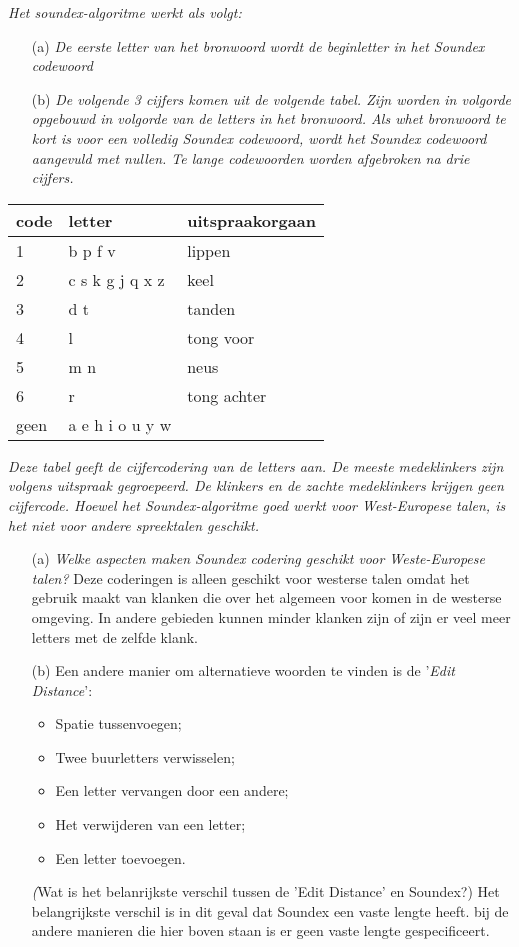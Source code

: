 \emph{Het soundex-algoritme werkt als volgt:}
\begin{itemize}
  \item[(a)]\emph{De eerste letter van het bronwoord wordt de beginletter in het Soundex codewoord}
  \item[(b)]\emph{De volgende 3 cijfers komen uit de volgende tabel. Zijn worden in volgorde opgebouwd in volgorde van de letters in het bronwoord. Als whet bronwoord te kort is voor een volledig Soundex codewoord, wordt het Soundex codewoord aangevuld met nullen. Te lange codewoorden worden afgebroken na drie cijfers.}
\end{itemize}

\begin{tabular}{lll}
code & letter & uitspraakorgaan \\
\hline
1 & b p f v & lippen\\
2 & c s k g j q x z & keel\\
3 & d t & tanden\\
4 & l & tong voor\\
5 & m n & neus \\
6 & r & tong achter \\
geen & a e h i o u y w & \\
\end{tabular}

\emph{Deze tabel geeft de cijfercodering van de letters aan. De meeste medeklinkers zijn volgens uitspraak gegroepeerd. De klinkers en de zachte medeklinkers krijgen geen cijfercode. Hoewel het Soundex-algoritme goed werkt voor West-Europese talen, is het niet voor andere spreektalen geschikt.}
\begin{itemize}
  \item[(a)] \emph{Welke aspecten maken Soundex codering geschikt voor Weste-Europese talen?}
    Deze coderingen is alleen geschikt voor westerse talen omdat het gebruik maakt van klanken die over het algemeen voor komen in de westerse omgeving. In andere gebieden kunnen minder klanken zijn of zijn er veel meer letters met de zelfde klank.
  \item[(b)] Een andere manier om alternatieve woorden te vinden is de '\emph{Edit Distance}':
    \begin{itemize}
      \item Spatie tussenvoegen;
      \item Twee buurletters verwisselen;
      \item Een letter vervangen door een andere;
      \item Het verwijderen van een letter;
      \item Een letter toevoegen.
    \end{itemize}
    \emph(Wat is het belanrijkste verschil tussen de 'Edit Distance' en Soundex?)
    Het belangrijkste verschil is in dit geval dat Soundex een vaste lengte heeft. bij de andere manieren die hier boven staan is er geen vaste lengte gespecificeert.
\end{itemize}

